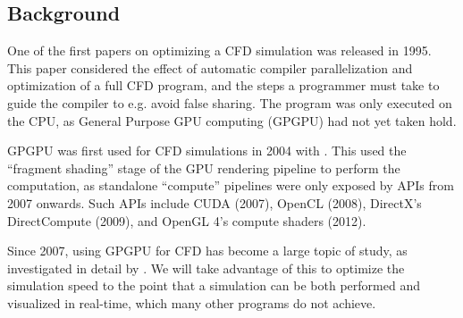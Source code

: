 \subsection{Background}
One of the first papers on optimizing a CFD simulation was released in 1995\cite{paper:1995CfdOpt:1383209}.
This paper considered the effect of automatic compiler parallelization and optimization of a full CFD program, and the steps a programmer must take to guide the compiler to e.g. avoid false sharing.
The program was only executed on the CPU, as General Purpose GPU computing (GPGPU) had not yet taken hold.

GPGPU was first used for CFD simulations in 2004 with \cite{paper:2004CfdGPU:10.1109/SC.2004.26}.
This used the ``fragment shading'' stage of the GPU rendering pipeline to perform the computation, as standalone ``compute'' pipelines were only exposed by APIs from 2007 onwards.
Such APIs include CUDA (2007)\cite{tool:CUDAProgrammingV1}, OpenCL (2008)\cite{tool:OpenCL1.0PressRelease}, DirectX's DirectCompute (2009)\cite{tool:DirectComputePresentation}, and OpenGL 4's compute shaders (2012)\cite{tool:OpenGLComputeShaderExt}.

Since 2007, using GPGPU for CFD has become a large topic of study, as investigated in detail by \cite{paper:GPGPUSummary:10.1007/s11227-013-1015-7}.
We will take advantage of this to optimize the simulation speed to the point that a simulation can be both performed and visualized in real-time, which many other programs do not achieve.
